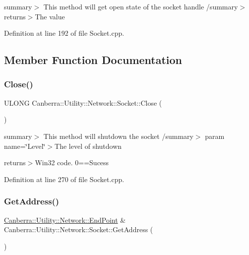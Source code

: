 summary$>$ This method will get open state of the socket handle /summary$>$ returns$>$The value

Definition at line 192 of file Socket.\+cpp.



\subsection{Member Function Documentation}
\mbox{\label{class_canberra_1_1_utility_1_1_network_1_1_socket_aeeb878451ad2858353a03d7314a9e21a_aeeb878451ad2858353a03d7314a9e21a}} 
\subsubsection{\texorpdfstring{Close()}{Close()}}
{\footnotesize\ttfamily U\+L\+O\+NG Canberra\+::\+Utility\+::\+Network\+::\+Socket\+::\+Close (\begin{DoxyParamCaption}{ }\end{DoxyParamCaption})}

summary$>$ This method will shutdown the socket /summary$>$ param name=\char`\"{}\+Level\char`\"{}$>$The level of shutdown

returns$>$Win32 code. 0==Sucess

Definition at line 270 of file Socket.\+cpp.

\mbox{\label{class_canberra_1_1_utility_1_1_network_1_1_socket_ace32db4f002b8c15c5b02ef539393909_ace32db4f002b8c15c5b02ef539393909}} 
\subsubsection{\texorpdfstring{Get\+Address()}{GetAddress()}}
{\footnotesize\ttfamily \hyperlink{class_canberra_1_1_utility_1_1_network_1_1_end_point}{Canberra\+::\+Utility\+::\+Network\+::\+End\+Point} \& Canberra\+::\+Utility\+::\+Network\+::\+Socket\+::\+Get\+Address (\begin{DoxyParamCaption}{ }\end{DoxyParamCaption})}

